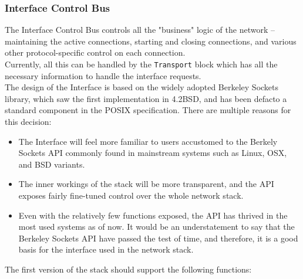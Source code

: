 \subsubsection{Interface Control Bus}\label{subsubsec:interface_control}
The Interface Control Bus controls all the "business" logic of the network --
maintaining the active connections, starting and closing connections, and various
other protocol-specific control on each connection.\\
Currently, all this can be handled by the \texttt{Transport} block which has all
the necessary information to handle the interface requests.\\
The design of the Interface is based on the widely adopted Berkeley Sockets library,
which saw the first implementation in 4.2BSD, and has been defacto a standard
component in the POSIX specification\cite{tcpip_illustrated_vol2}. There are
multiple reasons for this decision:
\begin{itemize}
\item The Interface will feel more familiar to users accustomed to the Berkely
Sockets API commonly found in mainstream systems such as Linux, OSX, and BSD
variants.

\item The inner workings of the stack will be more transparent, and the API
exposes fairly fine-tuned control over the whole network stack.

\item Even with the relatively few functions exposed, the API
has thrived in the most used systems as of now. It would be an understatement to
say that the Berkeley Sockets API have passed the test of time, and therefore, it
is a good basis for the interface used in the network stack.

\end{itemize}
The first version of the stack should support the following functions:
